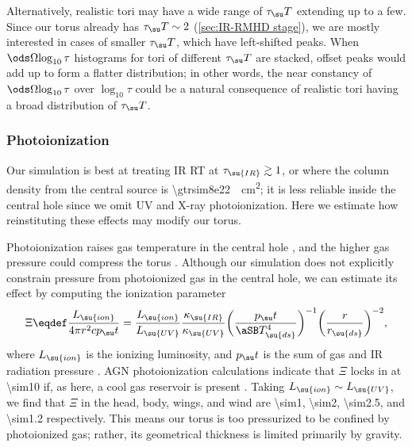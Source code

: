 \documentclass[twocolumn]{article}
\newcommand*\xray{\texorpdfstring{X\protect\nobreakdash-ray}{X-ray}}
\begin{document}
Alternatively, realistic tori may have a wide range of $\tau_\su T$ extending
up to a few. Since our torus already has $\tau_\su T\sim2$ (\cref{sec:IR-RMHD
stage}), we are mostly interested in cases of smaller $\tau_\su T$, which have
left-shifted peaks. When $\ods\Omega{\log_{10}\tau}$ histograms for tori of
different $\tau_\su T$ are stacked, offset peaks would add up to form a flatter
distribution; in other words, the near constancy of $\ods\Omega{\log_{10}\tau}$
over $\log_{10}\tau$ could be a natural consequence of realistic tori having a
broad distribution of $\tau_\su T$.

\subsubsection{Photoionization}
\label{sec:photoionization}

Our simulation is best at treating \ac{IR} \ac{RT} at $\tau_\su{IR}\gtrsim1$,
or where the column density from the central source is
\SI{\gtrsim8e22}{\per\square\centi\meter}; it is less reliable inside the
central hole since we omit \ac{UV} and \xray{} photoionization. Here we
estimate how reinstituting these effects may modify our torus.

Photoionization raises gas temperature in the central hole
\citep{1986ApJ...308L..55K, 2001ApJ...561..684K}, and the higher gas pressure
could compress the torus \citep{2012ApJ...761...70D, 2016ApJ...819..115D}.
Although our simulation does not explicitly constrain pressure from
photoionized gas in the central hole, we can estimate its effect by computing
the ionization parameter
\begin{equation}
\Xi\eqdef\frac{L_\su{ion}}{4\pi r^2cp_\su t}
  =\frac{L_\su{ion}}{L_\su{UV}}\frac{\kappa_\su{IR}}{\kappa_\su{UV}}
  \biggl(\frac{p_\su t}{\aSB T_\su{ds}^4}\biggr)^{-1}
  \biggl(\frac r{r_\su{ds}}\biggr)^{-2},
\end{equation}
where $L_\su{ion}$ is the ionizing luminosity, and $p_\su t$ is the sum of gas
and \ac{IR} radiation pressure \citep{1981ApJ...249..422K}. \Ac{AGN}
photoionization calculations indicate that $\Xi$ locks in at \num{\sim10} if,
as here, a cool gas reservoir is present \citep{2001ApJ...561..684K}. Taking
$L_\su{ion}\sim L_\su{UV}$, we find that $\Xi$ in the head, body, wings, and
wind are \num{\sim1}, \num{\sim2}, \num{\sim2.5}, and \num{\sim1.2}
respectively. This means our torus is too pressurized to be confined by
photoionized gas; rather, its geometrical thickness is limited primarily by
gravity.
\end{document}
